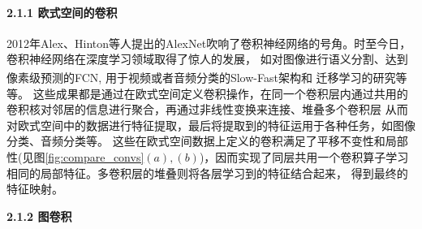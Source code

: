   \textbf{2.1.1 欧式空间的卷积}

  2012年Alex、Hinton等人提出的AlexNet\textsuperscript{\cite{AlexNet}}吹响了卷积神经网络的号角。时至今日，卷积神经网络在深度学习领域取得了惊人的发展，
  如对图像进行语义分割、达到像素级预测的FCN\textsuperscript{\cite{FCN}}, 用于视频或者音频分类的Slow-Fast架构\textsuperscript{\cite{VideoSlowFast,AudioSlowFast}}和
  迁移学习的研究\textsuperscript{\cite{Transferable}}等等。
  这些成果都是通过在欧式空间定义卷积操作，在同一个卷积层内通过共用的卷积核对邻居的信息进行聚合，再通过非线性变换来连接、堆叠多个卷积层
  从而对欧式空间中的数据进行特征提取，最后将提取到的特征运用于各种任务，如图像分类、音频分类等。
  这些在欧式空间数据上定义的卷积满足了平移不变性和局部性(见图\ref*{fig:compare_convs}$(a),(b)$)，因而实现了同层共用一个卷积算子学习相同的局部特征。多卷积层的堆叠则将各层学习到的特征结合起来，
  得到最终的特征映射。

  \textbf{2.1.2 图卷积}

